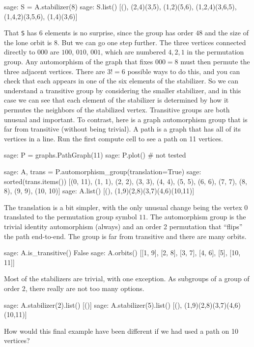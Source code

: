 %
\begin{sageexample}
sage: S = A.stabilizer(8)
sage: S.list()
[(), (2,4)(3,5), (1,2)(5,6), (1,2,4)(3,6,5), (1,4,2)(3,5,6),
 (1,4)(3,6)]
\end{sageexample}
%
That \verb?S? has $6$ elements is no surprise, since the group has order $48$ and the size of the lone orbit is $8$.  But we can go one step further.  The three vertices connected directly to $000$ are $100$, $010$, $001$, which are numbered $4, 2, 1$ in the permutation group.  Any automorphism of the graph that fixes $000 = 8$ must then permute the three adjacent vertices.  There are $3!=6$ possible ways to do this, and you can check that each appears in one of the six elements of the stabilizer.  So we can understand a transitive group by considering the smaller stabilizer, and in this case we can see that each element of the stabilizer is determined by how it permutes the neighbors of the stabilized vertex.
%
Transitive groups are both unusual and important.  To contrast, here is a graph automorphism group that is far from transitive (without being trivial).  A path is a graph that has all of its vertices in a line.  Run the first compute cell to see a path on 11 vertices.
%
%
\begin{sageexample}
sage: P = graphs.PathGraph(11)
sage: P.plot()       # not tested
\end{sageexample}
%
\begin{sageexample}
sage: A, trans = P.automorphism_group(translation=True)
sage: sorted(trans.items())
[(0, 11), (1, 1), (2, 2), (3, 3), (4, 4), (5, 5),
 (6,  6), (7, 7), (8, 8), (9, 9), (10, 10)]
sage: A.list()
[(), (1,9)(2,8)(3,7)(4,6)(10,11)]
\end{sageexample}
%
The translation is a bit simpler, with the only unusual change being the vertex $0$ translated to the permutation group symbol $11$.  The automorphism group is the trivial identity automorphism (always) and an order 2 permutation that ``flips'' the path end-to-end.  The group is far from transitive and there are many orbits.
%
\begin{sageexample}
sage: A.is_transitive()
False
sage: A.orbits()
[[1, 9], [2, 8], [3, 7], [4, 6], [5], [10, 11]]
\end{sageexample}
%
Most of the stabilizers are trivial, with one exception.  As subgroups of a group of order 2, there really are not too many options.
%
\begin{sageexample}
sage: A.stabilizer(2).list()
[()]
sage: A.stabilizer(5).list()
[(), (1,9)(2,8)(3,7)(4,6)(10,11)]
\end{sageexample}
%
How would this final example have been different if we had used a path on 10 vertices?
%